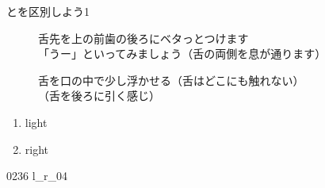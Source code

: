 \documentclass[aspectratio=169, xcolor={dvipsnames,table}]{beamer}
\begin{document}
\begin{frame}[plain]{とを区別しよう1}
  \begin{description}
    \item[] 舌先を上の前歯の後ろにベタっとつけます\\
          「うー」といってみましょう（舌の両側を息が通ります）

    \item[] 舌を口の中で少し浮かせる（舌はどこにも触れない）\\ （舌を後ろに引く感じ）
  \end{description}

  \Large
  \begin{enumerate}
    \item light\hfill{}\hspace{250pt}\mbox{}

    \item right\hfill{}\hspace{250pt}\mbox{}
  \end{enumerate}

  \hfill\hfill{\tiny 0236}\,{\scriptsize {}}\,{\tiny l\_r\_04}
\end{frame}
\end{document}
